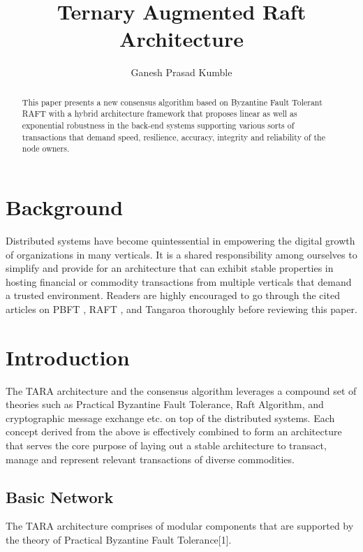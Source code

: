 \documentclass[]{article}
\title{Ternary Augmented Raft Architecture}
\author{Ganesh Prasad Kumble}
\begin{document}
\date{}
\maketitle

\begin{abstract}
This paper presents a new consensus algorithm based on Byzantine Fault Tolerant\cite{ARTICLE:1} RAFT \cite{ARTICLE:2} with a hybrid architecture framework that proposes linear as well as exponential robustness in the back-end systems supporting various sorts of transactions that demand speed, resilience, accuracy, integrity and reliability of the node owners.
\end{abstract}

\section{Background}
Distributed systems have become quintessential in empowering the digital growth of organizations in many verticals. It is a shared responsibility among ourselves to simplify and provide for an architecture that can exhibit stable properties in hosting financial or commodity transactions from multiple verticals that demand a trusted environment. Readers are highly encouraged to go through the cited articles on PBFT \cite{ARTICLE:1}, RAFT \cite{ARTICLE:2}, and Tangaroa \cite{ARTICLE:3} thoroughly before reviewing this paper.

\section{Introduction}
The TARA architecture and the consensus algorithm leverages a compound set of theories such as Practical Byzantine Fault Tolerance\cite{ARTICLE:1}, Raft Algorithm\cite{ARTICLE:2}, and cryptographic message exchange etc. on top of the distributed systems\cite{ARTICLE:3}. Each concept derived from the above is effectively combined to form an architecture that serves the core purpose of laying out a stable architecture to transact, manage and represent relevant transactions of diverse commodities.

\subsection{Basic Network}
The TARA architecture comprises of modular components that are supported by the theory of Practical Byzantine Fault Tolerance[1]. 
\end{document}
